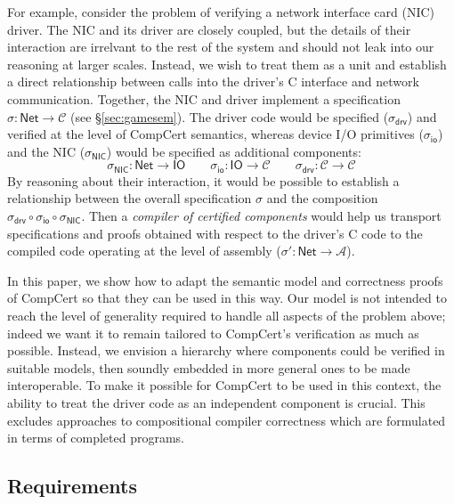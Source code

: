 \documentclass[draft,11pt]{report}
\theoremstyle{definition}
\newcommand{\kw}[1]{\ensuremath{ \mathsf{#1} }}
\begin{document}
For example,
consider the problem of verifying
a network interface card (NIC) driver.
The NIC and its driver are closely coupled,
but the details of their interaction
are irrelvant to the rest of the system
and should not leak into our reasoning at larger scales.
Instead,
we wish to treat them as a unit
and establish a direct relationship between calls into
the driver's C interface and network communication.
Together, the NIC and driver implement
a specification $\sigma :
\kw{Net} \rightarrow \mathcal{C}$ (see \S\ref{sec:gamesem}). %
The driver code would be specified
($\sigma_\kw{drv}$)
and verified
at the level of CompCert semantics,
whereas device I/O primitives
($\sigma_\kw{io}$)
and the NIC
($\sigma_\kw{NIC}$)
would be specified as additional components:
\[
  \sigma_\kw{NIC} : \kw{Net} \rightarrow \kw{IO}
  \qquad
  \sigma_\kw{io} : \kw{IO} \rightarrow \mathcal{C}
  \qquad
  \sigma_\kw{drv} : \mathcal{C} \rightarrow \mathcal{C}
\]
By reasoning about their interaction,
it would be possible to establish a relationship between
the overall specification $\sigma$ and
the composition
$\sigma_\kw{drv} \circ \sigma_\kw{io} \circ \sigma_\kw{NIC}$.
Then a \emph{compiler of certified components}
would help us transport specifications and proofs
obtained with respect to the driver's C code
to the compiled code operating at the level of assembly
($\sigma' : \kw{Net} \rightarrow \mathcal{A}$).

In this paper, we show how to adapt
the semantic model and correctness proofs of CompCert
so that they can be used in this way.
Our model is not intended to reach the level of generality
required to handle all aspects of the problem above;
indeed we want it to remain tailored to CompCert's
verification as much as possible.
Instead, we envision a hierarchy
where components could be verified in suitable models,
then soundly embedded in more general ones
to be made interoperable.
To make it possible for CompCert to be used in this context,
the ability to treat the driver code as an
independent component is crucial.
This excludes approaches to
compositional compiler correctness
which are formulated in terms of completed programs.


\subsection{Requirements} \label{sec:compcertreq} %
\end{document}
